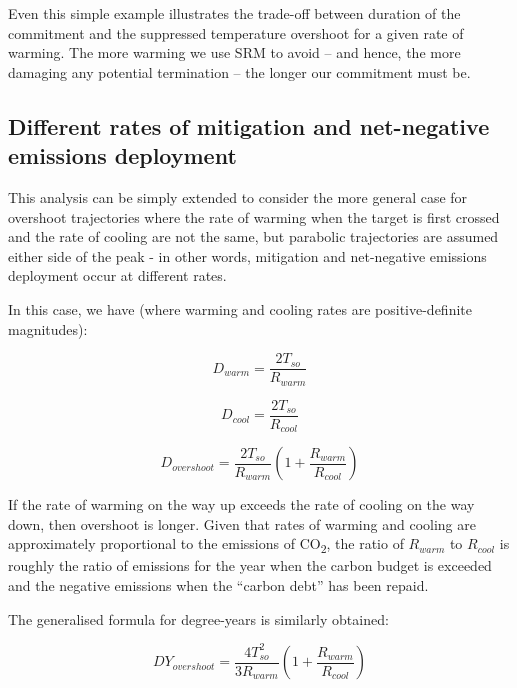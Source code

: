 \documentclass[draft]{agujournal2019}
\begin{document}
\medskip

Even this simple example illustrates the trade-off between duration of the commitment and the suppressed temperature overshoot for a given rate of warming. The more warming we use SRM to avoid – and hence, the more damaging any potential termination – the longer our commitment must be.

\subsection{Different rates of mitigation and net-negative emissions deployment}

This analysis can be simply extended to consider the more general case for overshoot trajectories where the rate of warming when the target is first crossed and the rate of cooling are not the same, but parabolic trajectories are assumed either side of the peak - in other words, mitigation and net-negative emissions deployment occur at different rates. 

In this case, we have (where warming and cooling rates are positive-definite magnitudes):

\medskip

\begin{equation}
D_{warm} = \frac{2T_{so}}{R_{warm}} 
\end{equation}

\begin{equation}
D_{cool} =  \frac{2T_{so}}{R_{cool}}
\end{equation}

\begin{equation}
D_{overshoot} = \frac{2T_{so}}{R_{warm}}  \left( 1 + \frac{R_{warm}}{R_{cool}} \right) 
\end{equation}

\medskip


If the rate of warming on the way up exceeds the rate of cooling on the way down, then overshoot is longer. Given that rates of warming and cooling are approximately proportional to the emissions of CO\textsubscript{2}, the ratio of $ R_{warm} $ to $ R_{cool} $ is roughly the ratio of emissions for the year when the carbon budget is exceeded and the negative emissions when the ``carbon debt” has been repaid. 

\medskip

The generalised formula for degree-years is similarly obtained:

\begin{equation}
D Y_{overshoot}=\frac{4 T_{so}^{2}}{3 R_{warm}}\left(1+\frac{R_{warm}}{R_{cool}}\right)
\end{equation}
\end{document}

